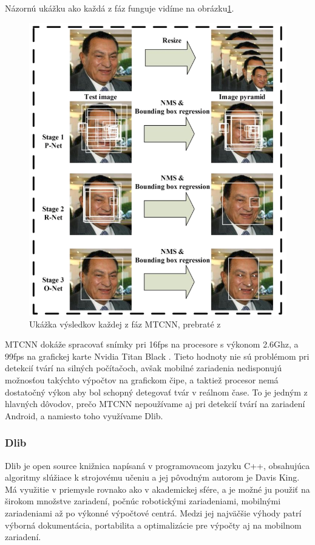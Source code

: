 \indent Názornú ukážku ako každá z fáz funguje vidíme na obrázku\ref{fig:mtcnn}.

\begin{figure}[H]
	\centering
	\includegraphics[width=0.6\linewidth]{img/mtcnn}
	\caption{Ukážka výsledkov každej z fáz MTCNN, prebraté z \cite[s.~2]{mtcnn}}
	\label{fig:mtcnn}
\end{figure}

\indent MTCNN dokáže spracovať snímky pri 16fps na procesore s výkonom 2.6Ghz, a 99fps na grafickej karte Nvidia Titan Black \cite{mtcnn}.
Tieto hodnoty nie sú problémom pri detekcií tvárí na silných počítačoch, avšak mobilné zariadenia nedisponujú možnosťou takýchto výpočtov na grafickom čipe, a taktiež procesor nemá dostatočný výkon aby bol schopný detegovať tvár v reálnom čase.
To je jedným z hlavných dôvodov, prečo MTCNN nepoužívame aj pri detekcií tvárí na zariadení Android, a namiesto toho využívame Dlib.

\subsubsection{Dlib}\label{l:dlib}
Dlib je open source knižnica napísaná v programovacom jazyku C++, obsahujúca algoritmy slúžiace k strojovému učeniu a jej pôvodným autorom je Davis King\cite{dlibCLib91}.
Má využitie v priemysle rovnako ako v akademickej sfére, a je možné ju použiť na širokom množstve zariadení, počnúc robotickými zariadeniami, mobilnými zariadeniami až po výkonné výpočtové centrá.
Medzi jej najväčšie výhody patrí výborná dokumentácia, portabilita a optimalizácie pre výpočty aj na mobilnom zariadení. \\

